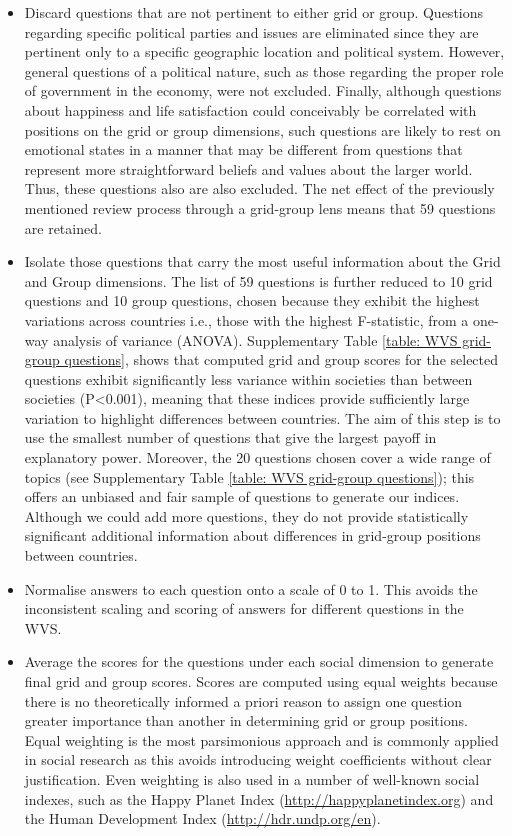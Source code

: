 \documentclass[12pt, a4paper]{article}
\begin{document}
\begin{itemize}

\item Discard questions that are not pertinent to either grid or group. Questions regarding specific political parties and issues are eliminated since they are pertinent only to a specific geographic location and political system. However, general questions of a political nature, such as those regarding the proper role of government in the economy, were not excluded. Finally, although questions about happiness and life satisfaction could conceivably be correlated with positions on the grid or group dimensions, such questions are likely to rest on emotional states in a manner that may be different from questions that represent more straightforward beliefs and values about the larger world. Thus, these questions also are also excluded. The net effect of the previously mentioned review process through a grid-group lens means that 59 questions are retained. \item Isolate those questions that carry the most useful information about the Grid and Group dimensions. The list of 59 questions is further reduced to 10 grid questions and 10 group questions, chosen because they exhibit the highest variations across countries i.e., those with the highest F-statistic, from a one-way analysis of variance (ANOVA). Supplementary Table \ref{table: WVS grid-group questions}, shows that computed grid and group scores for the selected questions exhibit significantly less variance within societies than between societies (P<0.001), meaning that these indices provide sufficiently large variation to highlight differences between countries. The aim of this step is to use the smallest number of questions that give the largest payoff in explanatory power. Moreover, the 20 questions chosen cover a wide range of topics (see Supplementary Table \ref{table: WVS grid-group questions}); this offers an unbiased and fair sample of questions to generate our indices. Although we could add more questions, they do not provide statistically significant additional information about differences in grid-group positions between countries. \item Normalise answers to each question onto a scale of 0 to 1. This avoids the inconsistent scaling and scoring of answers for different questions in the WVS. \item Average the scores for the questions under each social dimension to generate final grid and group scores. Scores are computed using equal weights because there is no theoretically informed a priori reason to assign one question greater importance than another in determining grid or group positions. Equal weighting is the most parsimonious approach and is commonly applied in social research \autocite{Babbie:2010vh} as this avoids introducing weight coefficients without clear justification. Even weighting is also used in a number of well-known social indexes, such as the Happy Planet Index (\url{http://happyplanetindex.org}) and the Human Development Index (\url{http://hdr.undp.org/en}).
\end{itemize}
\end{document}
